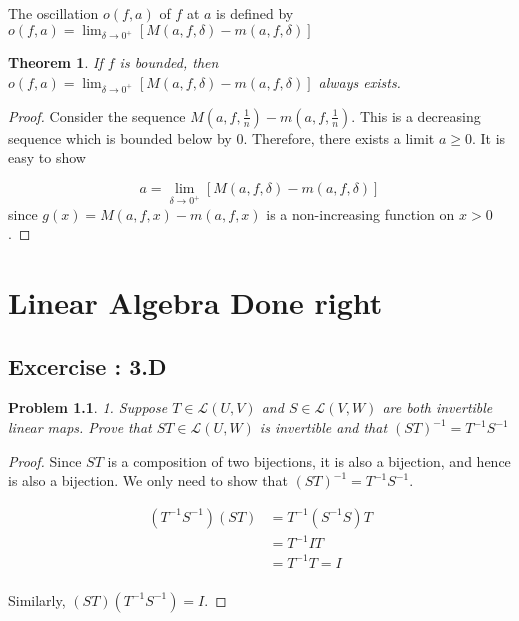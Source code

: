 \documentclass[12pt]{book}
\newtheorem{theorem}{Theorem}
\newtheorem*{problem*}{Problem}
\newcommand{\LL}{\mathcal{L}}
\begin{document}
The oscillation $o(f,a)$ of $f$ at $a$ is defined by $o(f,a) = \displaystyle\lim_{\delta \to 0^+} [M(a,f,\delta) - m(a,f,\delta)]$

\begin{theorem}
  If $f$ is bounded, then $o(f,a) = \displaystyle\lim_{\delta \to 0^+} [M(a,f,\delta) - m(a,f,\delta)]$ always exists. 
\end{theorem}

\begin{proof}
  Consider the sequence $M(a,f,\frac{1}{n}) - m(a,f,\frac{1}{n})$. This is a decreasing sequence which is bounded below by $0$. Therefore, there exists a limit $a \ge 0$. It is easy to show

  \[
  a = \lim_{\delta \to 0^+} [M(a,f,\delta) - m(a,f,\delta)]
  \]
  since $g(x) = M(a,f,x) - m(a,f,x)$ is a non-increasing function on $x > 0$. 
\end{proof}
%

\chapter{Linear Algebra Done right}

\section{Excercise : 3.D}

\begin{problem*}
  1. Suppose $T \in \LL(U,V)$ and $ S \in \LL(V,W)$ are both invertible
  linear maps. Prove that $ST \in \LL(U,W)$ is invertible and that $(ST)^{-1} = T^{-1}S^{-1}$
\end{problem*}

\begin{proof}
  Since $ST$ is a composition of two bijections, it is also a bijection, and hence is also a bijection. We only need to show that $(ST)^{-1} = T^{-1}S^{-1}$.

  \begin{align*}
    (T^{-1} S^{-1}) (S T) & = T^{-1} (S^{-1} S) T\\
    & = T^{-1} I T\\
    & = T^{-1}T = I \\
  \end{align*}

  Similarly, $(S T) (T^{-1} S^{-1}) = I$.
\end{proof}
\end{document}
